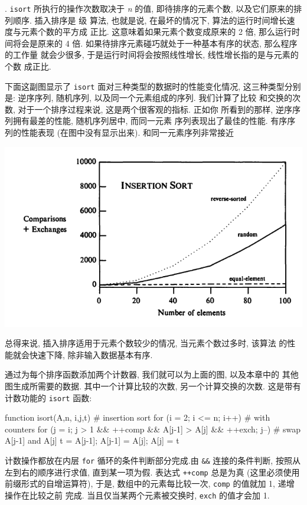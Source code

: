 . \texttt{isort} 所执行的操作次数取决于 \textit{n} 的值,
即待排序的元素个数, 以及它们原来的排列顺序. 插入排序是  级
算法, 也就是说, 在最坏的情况下, 算法的运行时间增长速度与元素个数的平方成
正比. 这意味着如果元素个数变成原来的 2 倍, 那么运行时间将会是原来的
4 倍. 如果待排序元素碰巧就处于一种基本有序的状态, 那么程序的工作量
就会少很多, 于是运行时间将会按照线性增长, 线性增长指的是与元素的个数
成正比.

下面这副图显示了 \texttt{isort} 面对三种类型的数据时的性能变化情况,
这三种类型分别是: 逆序序列, 随机序列, 以及同一个元素组成的序列.
我们计算了比较
和交换的次数, 对于一个排序过程来说, 这是两个很客观的指标. 正如你
所看到的那样, 逆序序列拥有最差的性能, 随机序列居中, 而同一元素
序列表现出了最佳的性能. 有序序列的性能表现 (在图中没有显示出来). 
和同一元素序列非常接近


\begin{center}
    \includegraphics[scale=0.7]{./images/insertion_sort.png}
\end{center}

总得来说, 插入排序适用于元素个数较少的情况, 当元素个数过多时, 该算法
的性能就会快速下降, 除非输入数据基本有序.

通过为每个排序函数添加两个计数器, 我们就可以为上面的图, 以及本章中的
其他图生成所需要的数据. 其中一个计算比较的次数, 另一个计算交换的次数.
这是带有计数功能的 \texttt{isort} 函数:
\begin{awkcode}
    function isort(A,n,     i,j,t) {  # insertion sort
        for (i = 2; i <= n; i++)      # with counters
            for (j = i; j > 1 && ++comp &&
              A[j-1] > A[j] && ++exch; j--) {
                # swap A[j-1] and A[j]
                t = A[j-1]; A[j-1] = A[j]; A[j] = t
            }
    }
\end{awkcode}
计数操作都放在内层 \texttt{for} 循环的条件判断部分完成.由 \verb'&&'
连接的条件判断, 按照从左到右的顺序进行求值, 直到某一项为假. 表达式
\texttt{++comp} 总是为真 (这里必须使用前缀形式的自增运算符), 于是,
数组中的元素每比较一次, \texttt{comp} 的值就加 1, 递增操作在比较之前
完成. 当且仅当某两个元素被交换时, \texttt{exch} 的值才会加 1.

